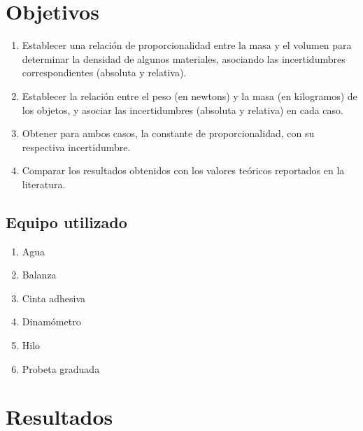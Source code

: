 \documentclass{article}
\begin{document}
\section*{Objetivos}
\begin{enumerate}
    \item Establecer una relación de proporcionalidad entre la masa y el volumen para determinar la densidad de algunos materiales, asociando las incertidumbres correspondientes (absoluta y relativa).
    \item Establecer la relación entre el peso (en newtons) y la masa (en kilogramos) de los objetos, y asociar las incertidumbres (absoluta y relativa) en cada caso.
    \item Obtener para ambos casos, la constante de proporcionalidad, con su respectiva incertidumbre.
    \item Comparar los resultados obtenidos con los valores teóricos reportados en la
literatura.
\end{enumerate}


\subsection*{Equipo utilizado}
\begin{enumerate}
    \item Agua
    \item Balanza
    \item Cinta adhesiva
    \item Dinamómetro
    \item Hilo
    \item Probeta graduada
\end{enumerate}

\section{Resultados}
\end{document}
